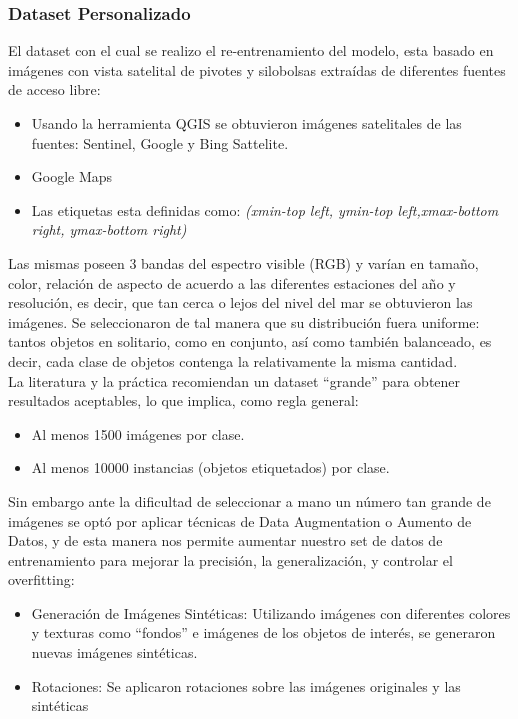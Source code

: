 \newpage
\subsubsection{Dataset Personalizado}
El dataset con el cual se realizo el re-entrenamiento del modelo, esta basado en imágenes con vista satelital de pivotes y silobolsas extraídas de diferentes fuentes de acceso libre:
\begin{itemize}
    \item Usando la herramienta QGIS \cite{qgis} se obtuvieron imágenes satelitales de las fuentes: Sentinel, Google y Bing Sattelite.
    \item Google Maps
    \item Las etiquetas esta definidas como: \textit{(xmin-top left, ymin-top left,xmax-bottom right, ymax-bottom right)}
\end{itemize}

Las mismas poseen 3 bandas del espectro visible (RGB) y varían en tamaño, color, relación de aspecto de acuerdo a las diferentes estaciones del año y resolución, es decir, que tan cerca o lejos del nivel del mar se obtuvieron las imágenes. Se seleccionaron de tal manera que su distribución fuera uniforme: tantos objetos en solitario, como en conjunto, así como también balanceado, es decir, cada clase de objetos contenga la relativamente la misma cantidad.\\ 

La literatura y la práctica recomiendan un dataset “grande” para obtener resultados aceptables, lo que implica, como regla general:
\begin{itemize}
    \item Al menos 1500 imágenes por clase.
    \item Al menos 10000 instancias (objetos etiquetados) por clase.
\end{itemize}

Sin embargo ante la dificultad de seleccionar a mano un número tan grande de imágenes se optó por aplicar técnicas de Data Augmentation o Aumento de Datos, y de esta manera nos permite aumentar nuestro set de datos de entrenamiento para mejorar la precisión, la generalización, y controlar el overfitting:
\begin{itemize}
    \item Generación de Imágenes Sintéticas: Utilizando imágenes con diferentes colores y texturas como ``fondos'' e imágenes de los objetos de interés, se generaron nuevas imágenes sintéticas.
    \item Rotaciones: Se aplicaron rotaciones sobre las imágenes originales y las sintéticas
\end{itemize}

